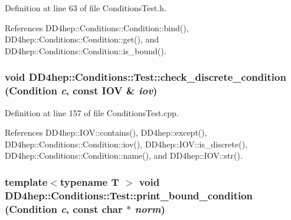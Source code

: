 Definition at line 63 of file ConditionsTest.h.

References DD4hep::Conditions::Condition::bind(), DD4hep::Conditions::Condition::get(), and DD4hep::Conditions::Condition::is\_\-bound().\hypertarget{namespace_d_d4hep_1_1_conditions_1_1_test_a49378cef6a8e31974f1f44b1eaf39b3a}{
\subsubsection[{check\_\-discrete\_\-condition}]{\setlength{\rightskip}{0pt plus 5cm}void DD4hep::Conditions::Test::check\_\-discrete\_\-condition ({\bf Condition} {\em c}, \/  const IOV \& {\em iov})}}
\label{namespace_d_d4hep_1_1_conditions_1_1_test_a49378cef6a8e31974f1f44b1eaf39b3a}


Definition at line 157 of file ConditionsTest.cpp.

References DD4hep::IOV::contains(), DD4hep::except(), DD4hep::Conditions::Condition::iov(), DD4hep::IOV::is\_\-discrete(), DD4hep::Conditions::Condition::name(), and DD4hep::IOV::str().\hypertarget{namespace_d_d4hep_1_1_conditions_1_1_test_ae50648dc20623f019e5b52d502c99216}{
\subsubsection[{print\_\-bound\_\-condition}]{\setlength{\rightskip}{0pt plus 5cm}template$<$typename T $>$ void DD4hep::Conditions::Test::print\_\-bound\_\-condition ({\bf Condition} {\em c}, \/  const char $\ast$ {\em norm})}}
\label{namespace_d_d4hep_1_1_conditions_1_1_test_ae50648dc20623f019e5b52d502c99216}


